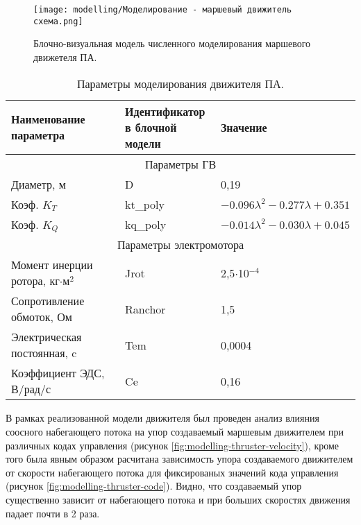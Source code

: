 \begin{figure}[ht]
    \centering
    \texttt{[image: modelling/Моделирование - маршевый движитель схема.png]}
    \caption{Блочно-визуальная модель численного моделирования маршевого движетеля ПА.}
    \label{fig:modelling-thruster}
\end{figure}

\begin{table}
    \caption{Параметры моделирования движителя ПА.}
    \label{tab:modelling-thruster}
    \centering
    \begin{tabular}{lll}
        \toprule
        \makecell[l]{Наименование \\ параметра} & \makecell[l]{Идентификатор \\ в блочной модели} & Значение \\
        \midrule
        \multicolumn{3}{c}{Параметры ГВ} \\
        \midrule
        Диаметр, м  & D & 0,19\\
        Коэф. $K_T$ & kt\_poly & $-0.096\lambda^2 -0.277\lambda + 0.351$\\
        Коэф. $K_Q$ & kq\_poly & $-0.014\lambda^2 -0.030\lambda + 0.045$\\
        \midrule
        \multicolumn{3}{c}{Параметры электромотора} \\
        \midrule
        Момент инерции ротора, кг$\cdot$м$^2$ & Jrot & 2,5$\cdot$10$^{-4}$ \\
        Сопротивление обмоток, Ом & Ranchor & 1,5 \\
        Электрическая постоянная, c & Tem & 0,0004 \\
        Коэффициент ЭДС, В/рад/с & Ce & 0,16 \\
        \bottomrule
    \end{tabular}
\end{table}

В рамках реализованной модели движителя был проведен анализ влияния соосного набегающего потока на упор создаваемый маршевым движителем при различных кодах управления (рисунок \ref{fig:modelling-thruster-velocity}), кроме того была явным образом расчитана зависимость упора создаваемого движителем от скорости набегающего потока для фиксированых значений кода управления (рисунок \ref{fig:modelling-thruster-code}).
Видно, что создаваемый упор существенно зависит от набегающего потока и при больших скоростях движения падает почти в 2 раза.

